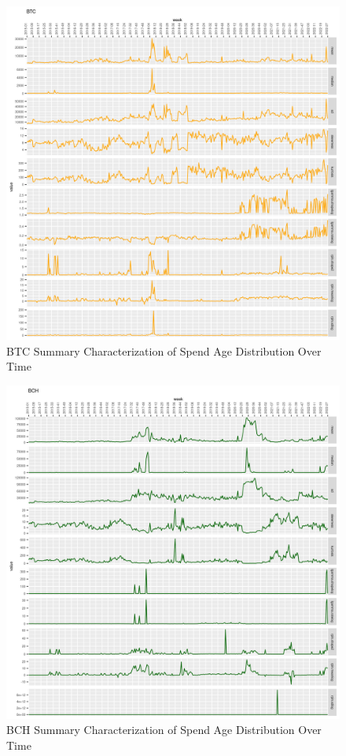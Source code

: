 \documentclass[english]{article}
\begin{document}
\begin{figure}[H]
\caption{BTC Summary Characterization of Spend Age Distribution Over Time}
\label{figure-BTC-Summary-Characterization}

\includegraphics[scale=0.9]{images/spend-age-summary-BTC}
\end{figure}

\begin{figure}[H]
\caption{BCH Summary Characterization of Spend Age Distribution Over Time}

\includegraphics[scale=0.9]{images/spend-age-summary-BCH}
\end{figure}
\end{document}
